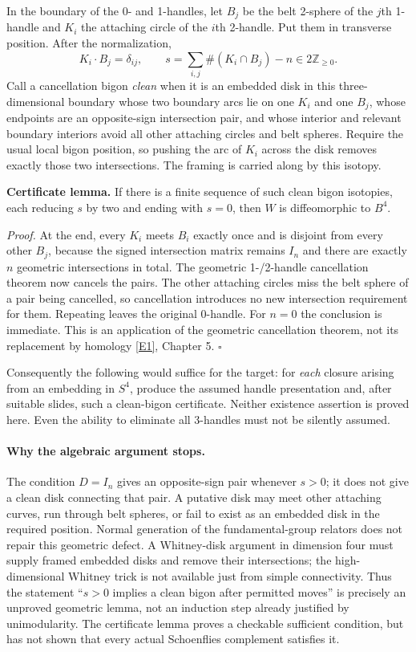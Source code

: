 \documentclass[11pt,a4paper]{article}
\newcommand{\Z}{\mathbb{Z}}
\newcommand{\eref}[2]{\hyperlink{extra:#1:#2}{[E#2]}}
\numberwithin{equation}{section}
\begin{document}
In the boundary of the 0- and 1-handles, let $B_j$ be the belt 2-sphere
of the $j$th 1-handle and $K_i$ the attaching circle of the $i$th
2-handle. Put them in transverse position. After the normalization,
\begin{equation}
 K_i\mathbin{\cdot} B_j=\delta_{ij},\qquad
 s=\sum_{i,j}\#(K_i\cap B_j)-n\in 2\Z_{\geq0}.
\end{equation}
Call a cancellation bigon \emph{clean} when it is an embedded disk in
this three-dimensional boundary whose two boundary arcs lie on one
$K_i$ and one $B_j$, whose endpoints are an opposite-sign intersection
pair, and whose interior and relevant boundary interiors avoid all
other attaching circles and belt spheres. Require the usual local
bigon position, so pushing the arc of $K_i$ across the disk removes
exactly those two intersections. The framing is carried along by this
isotopy.

\textbf{Certificate lemma.} If there is a finite sequence of such clean
bigon isotopies, each reducing $s$ by two and ending with $s=0$, then
$W$ is diffeomorphic to $B^4$.

\emph{Proof.} At the end, every $K_i$ meets $B_i$ exactly once and is
disjoint from every other $B_j$, because the signed intersection matrix
remains $I_n$ and there are exactly $n$ geometric intersections in total.
The geometric 1-/2-handle cancellation theorem now cancels the pairs.
The other attaching circles miss the belt sphere of a pair being
cancelled, so cancellation introduces no new intersection requirement
for them. Repeating leaves the original 0-handle. For $n=0$ the
conclusion is immediate. This is an application of the geometric
cancellation theorem, not its replacement by homology
\eref{statement}{1}, Chapter 5. \hfill$\square$

Consequently the following would suffice for the target: for \emph{each}
closure arising from an embedding in $S^4$, produce the assumed
handle presentation and, after suitable slides, such a clean-bigon
certificate. Neither existence assertion is proved here. Even the
ability to eliminate all 3-handles must not be silently assumed.

\paragraph{Why the algebraic argument stops.}
The condition $D=I_n$ gives an opposite-sign pair whenever $s>0$; it
does not give a clean disk connecting that pair. A putative disk may
meet other attaching curves, run through belt spheres, or fail to exist
as an embedded disk in the required position. Normal generation of the
fundamental-group relators does not repair this geometric defect. A
Whitney-disk argument in dimension four must supply framed embedded
disks and remove their intersections; the high-dimensional Whitney
trick is not available just from simple connectivity. Thus the statement
``$s>0$ implies a clean bigon after permitted moves'' is precisely an
unproved geometric lemma, not an induction step already justified by
unimodularity. The certificate lemma proves a checkable sufficient
condition, but has not shown that every actual Schoenflies complement
satisfies it.
\end{document}
